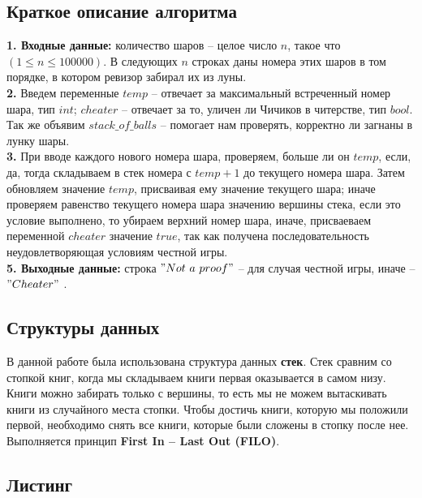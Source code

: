 \documentclass[a5paper, 10pt]{article}
\theoremstyle{definition}
\theoremstyle{plain}
\theoremstyle{remark}
\begin{document}
\subsection{Краткое описание алгоритма}
\textbf{1. Входные данные:} количество шаров -- целое число $n$, такое что $(1 \leq n \leq 100000)$. В следующих $n$ строках даны номера этих шаров в том порядке, в котором ревизор забирал их из луны. \\
\textbf{2.} Введем переменные $temp$ -- отвечает за максимальный встреченный номер шара, тип $int$; $cheater$ -- отвечает за то, уличен ли Чичиков в читерстве, тип $bool$. Так же объявим $stack\_of\_balls$ -- помогает нам проверять, корректно ли загнаны в лунку шары. \\
\textbf{3.} При вводе каждого нового номера шара, проверяем, больше ли он $temp$, если, да, тогда складываем в стек номера с $temp + 1$ до текущего номера шара. Затем обновляем значение $temp$, присваивая ему значение текущего шара; иначе проверяем равенство текущего номера шара значению вершины стека, если это условие выполнено, то убираем верхний номер шара, иначе, присваеваем переменной $cheater$ значение $true$, так как получена последовательность неудовлетворяющая условиям честной игры. \\
\textbf{5. Выходные данные:} строка $"Not\,\, a \,\, proof"$ -- для случая честной игры, иначе -- $"Cheater"$ .

\subsection{Структуры данных}
В данной работе была использована структура данных \textbf{стек}. Стек сравним со стопкой книг, когда мы складываем книги первая оказывается в самом низу. Книги можно забирать только с вершины, то есть мы не можем вытаскивать книги из случайного места стопки. Чтобы достичь книги, которую мы положили первой, необходимо снять все книги, которые были сложены в стопку после нее. Выполняется принцип \textbf{First In -- Last Out (FILO)}.

\newpage
\subsection{Листинг}
\end{document}
